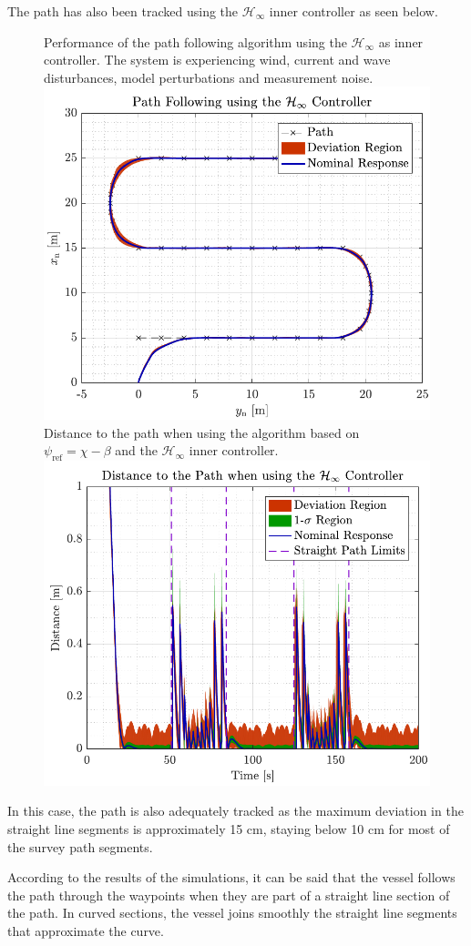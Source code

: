 The path has also been tracked using the $\mathcal{H}_\infty$ inner controller as seen below.
\begin{figure}[H]
    \captionbox 
    {   
        Performance of the path following algorithm using the $\mathcal{H}_\infty$ as inner controller. The system is experiencing wind, current and wave disturbances, model perturbations and measurement noise. \label{fig:path_rob2}
    }                                                                 
    {                                                                  
        \includegraphics[width=.45\textwidth]{figures/path_rob}         
    }                                                                    
    \hspace{5pt}                                                          
    \captionbox  
    {      
        Distance to the path when using the algorithm based on $\psi_\mathrm{ref}=\chi-\beta$ and the $\mathcal{H}_\infty$ inner controller. \label{fig:dist_rob2}
    }                                                                          
    {
        \includegraphics[width=.45\textwidth]{figures/dist_rob}
    }
\end{figure}
In this case, the path is also adequately tracked as the maximum deviation in the straight line segments is approximately 15 cm, staying below 10 cm for most of the survey path segments.

According to the results of the simulations, it can be said that the vessel follows the path through the waypoints when they are part of a straight line section of the path. In curved sections, the vessel joins smoothly the straight line segments that approximate the curve. 

